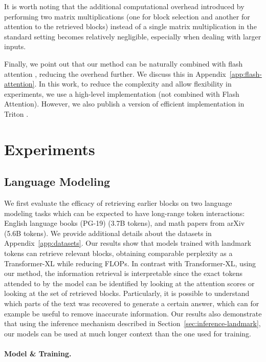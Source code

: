 It is worth noting that the additional computational overhead introduced by performing two matrix multiplications (one for block selection and another for attention to the retrieved blocks) instead of a single matrix multiplication in the standard setting becomes relatively negligible, especially when dealing with larger inputs. 

Finally, we point out that our method can be naturally combined with flash attention \cite{dao_flashattention_2022}, reducing the overhead further. We discuss this in Appendix~\ref{app:flash-attention}.  In this work, to reduce the complexity and allow flexibility in experiments, we use a high-level implementation (not combined with Flash Attention). However, we also publish a version of efficient implementation in Triton \cite{tillet2019triton}.

\section{Experiments}

\subsection{Language Modeling}
\label{sec:exp-lang-model}

We first evaluate the efficacy of retrieving earlier blocks on two language modeling tasks which can be expected to have long-range token interactions: English language books (PG-19) \cite{rae_compressive_2019} (3.7B tokens), and math papers from arXiv (5.6B tokens). We provide additional details about the datasets in Appendix~\ref{app:datasets}.
Our results show that models trained with landmark tokens can retrieve relevant blocks, obtaining comparable perplexity as a Transformer-XL while reducing FLOPs. In contrast with Transformer-XL, using our method, the information retrieval is interpretable since the exact tokens attended to by the model can be identified by looking at the attention scores or looking at the set of retrieved blocks. Particularly, it is possible to understand which parts of the text was recovered to generate a certain answer, which can for example be useful to remove inaccurate information. Our results also demonstrate that using the inference mechanism described in Section~\ref{sec:inference-landmark}, our models can be used at much longer context than the one used for training. 

\paragraph{Model \& Training.}

